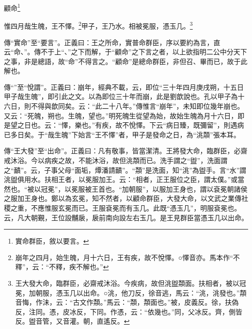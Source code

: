 顧命\footnote{實命群臣，敘以要言。}

惟四月哉生魄，王不懌。\footnote{崩年之四月，始生魄，月十六日，王有疾，故不悅懌。○懌音亦。馬本作“不釋”，云：“不釋，疾不解也。”}甲子，王乃水。相被冕服，憑玉几。\footnote{王大發大命，臨群臣，必齋戒沐浴。今疾病，故但洮盥頮面。扶相者，被以冠冕，加朝服，憑玉几以出命。○洮，他刀反，徐音逃，馬云：“洮，洮發也。”頮音悔，作沬，云：“古文作頮。”馬云：“頮，頮面也。”被，皮義反。徐，扶偽反，注同。憑，皮冰反，下同。作憑，云：“依幾也。”同，父冰反。齊，側皆反。盥音管，又音灌。朝，直遙反。}



{\noindent\zhuan{}\fzbyks 傳“實命”至“要言”。正義曰：王之所命，實普命群臣，序以要約為言，直云“命、”。傳不于上“、”之下而解，于“顧命”之下言之者，以上欲指明二公中分天下之事，非是總語，故“命”不得言之。“顧命”是總命群臣，非但召、畢而已，故于此解也。 \par}

{\noindent\zhuan{}\fzbyks 傳“”至“悅謂”。正義曰：崩年，經典不載，云，即位“三十年四月庚戌朔，十五日甲子哉生魄”，即引此之文。以為即位三十年而崩，此是劉歆說也。孔以甲子為十六日，則不得與歆同矣。云：“此二十八年。”傳惟言“崩年”，未知即位幾年崩也。又云：“死魄，朔也。生魄，望也。”明死魄生從望為始，故始生魄為月十六日，即是望之日也。云：“懌，樂也。”有疾，故不悅懌。下云“病日臻，既彌留”，則遇病已多日矣。于“哉生魄”下始言“王不懌”者，甲子是發命之日，為“洮頮”張本耳。 \par}

{\noindent\zhuan{}\fzbyks 傳“王大發”至“出命”。正義曰：凡有敬事，皆當潔清。王將發大命，臨群臣，必齋戒沐浴。今以病疾之故，不能沐浴，故但洮頮而已。洗手謂之“盥”，洗面謂之“靧”。云，子事父母“面垢，燂潘請靧”。“頮”是洗面，知“洮”為盥手。言“水”謂洮盥俱用水。扶相王者，以冕服加王。云：“相者，正王服位之臣，謂太僕。”或當然也。“被以冠冕”，以冕服被王首也。“加朝服”，以服加王身也，謂以袞冕朝諸侯之服加王身也。鄭以為玄冕，知不然者，以顧命群臣，大發大命，以文武之業傳社稷之重，不應惟服玄冕而已。王服袞冕而有玉几。此既“憑玉几”，明服袞冕也。云，凡大朝覲，王位設黼扆，扆前南向設左右玉几。是王見群臣當憑玉几以出命。 \par}

